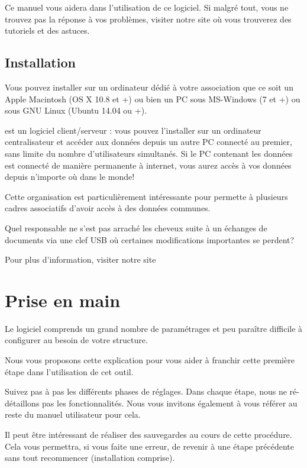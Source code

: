 \documentclass[a4paper,10pt,oneside,french]{sphinxmanual}
\begin{document}
Ce manuel vous aidera dans l’utilisation de ce logiciel.
Si malgré tout, vous ne trouvez pas la réponse à vos problèmes, visiter notre site  où vous trouverez des tutoriels et des astuces.


\subsection{Installation}
\label{\detokenize{syndic/presentation:installation}}
Vous pouvez installer  sur un ordinateur dédié à votre association que ce soit un Apple Macintosh (OS X 10.8 et +) ou bien un PC sous MS-Windows (7 et +) ou sous GNU Linux (Ubuntu 14.04 ou +).

 est un logiciel client/serveur : vous pouvez l’installer sur un ordinateur centralisateur et accéder aux données depuis un autre PC connecté au premier, sans limite du nombre d’utilisateurs simultanés.
Si le PC contenant les données est connecté de manière permanente à internet, vous aurez accès à vos données depuis n’importe où dans le monde!

Cette organisation est particulièrement intéressante pour permette à plusieurs cadres associatifs d’avoir accès à des données communes.

Quel responsable ne s’est pas arraché les cheveux suite à un échanges de documents via une clef USB où certaines modifications importantes se perdent?

Pour plus d’information, visiter notre site 


\section{Prise en main}
\label{\detokenize{syndic/first_step:prise-en-main}}\label{\detokenize{syndic/first_step::doc}}
Le logiciel  comprends un grand nombre de paramétrages et peu paraître difficile à configurer au besoin de votre structure.

Nous vous proposons cette explication pour vous aider à franchir cette première étape dans l’utilisation de cet outil.

Suivez pas à pas les différents phases de réglages. Dans chaque étape, nous ne ré-détaillons pas les fonctionnalités. Nous vous invitons également à vous référer au reste du manuel utilisateur pour cela.

Il peut être intéressant de réaliser des sauvegardes au cours de cette procédure.
Cela vous permettra, si vous faite une erreur, de revenir à une étape précédente sans tout recommencer (installation comprise).
\end{document}

